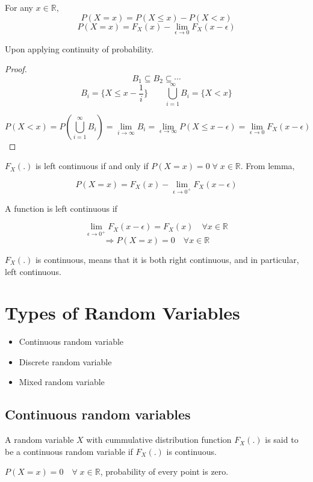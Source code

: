 \documentclass{article}
\begin{document}
\begin{lemma}
    For any $x \in \mathbb{R}$,
    $$ P(X=x)= P(X \leq x)- P(X <x)$$
    $$ P(X=x)= F_X(x)- \lim_{\epsilon \to 0}F_X(x- \epsilon)$$

\end{lemma}

Upon applying continuity of probability.

\begin{proof}
    $$ B_1 \subseteq B_2 \subseteq \cdots$$
    $$B_i=\{ X \leq x - \frac{1}{i}\} \qquad \bigcup_{i=1}^{\infty}B_i=\{ X<x\}$$

    $$ P(X<x)= P(\bigcup_{i=1}^{\infty}B_i)= \lim_{i \to \infty} B_i = \lim_{\epsilon \to \infty}P(X \leq x- \epsilon)= \lim_{\epsilon \to 0}F_X(x-\epsilon)$$
\end{proof}
\begin{corollary}
    $F_X(.)$ is left continuous if and only if $P(X=x)=0 \; \forall \; x \in \mathbb{R} $. From lemma,

    $$ P(X=x)= F_X(x)- \lim_{\epsilon \to 0^+ }F_X(x-\epsilon)$$

\end{corollary}

A function is left continuous if

$$  \lim_{\epsilon \to 0^+}F_X(x - \epsilon)= F_X(x) \quad \forall x \in \mathbb{R}$$
$$ \Rightarrow P(X=x)= 0 \quad \forall x \in \mathbb{R}$$

$F_X(.)$ is continuous, means that it is both right continuous, and in particular, left continuous.

\section{Types of Random Variables}
\begin{itemize}
    \item Continuous random variable
    \item Discrete random variable
    \item Mixed random variable
\end{itemize}

\subsection{Continuous random variables}
A random variable $X$ with cummulative distribution function $F_X(.)$ is said to be a continuous random variable if $F_X(.)$ is continuous.

$P(X=x)=0 \quad \forall \; x \in \mathbb{R}$, probability of every point is zero.
\end{document}
